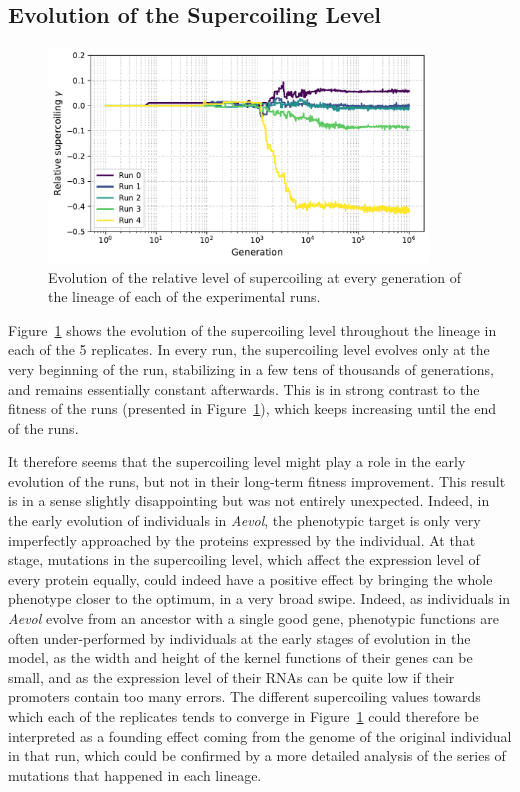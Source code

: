\subsection{Evolution of the Supercoiling Level}

\begin{figure}
\centering
\includegraphics[width=0.9\textwidth]{aevol/images/supercoiling_all.pdf}
\caption[Evolution of the supercoiling level of the experimental runs in \emph{Aevol}]{Evolution of the relative level of supercoiling at every generation of the lineage of each of the experimental runs.}
\label{fig:aevol:sc}
\end{figure}

Figure~\ref{fig:aevol:sc} shows the evolution of the supercoiling level throughout the lineage in each of the 5 replicates.
In every run, the supercoiling level evolves only at the very beginning of the run, stabilizing in a few tens of thousands of generations, and remains essentially constant afterwards.
This is in strong contrast to the fitness of the runs (presented in Figure~\ref{fig:aevol:sc}), which keeps increasing until the end of the runs.

It therefore seems that the supercoiling level might play a role in the early evolution of the runs, but not in their long-term fitness improvement.
This result is in a sense slightly disappointing but was not entirely unexpected.
Indeed, in the early evolution of individuals in \emph{Aevol}, the phenotypic target is only very imperfectly approached by the proteins expressed by the individual.
At that stage, mutations in the supercoiling level, which affect the expression level of every protein equally, could indeed have a positive effect by bringing the whole phenotype closer to the optimum, in a very broad swipe.
Indeed, as individuals in \emph{Aevol} evolve from an ancestor with a single good gene, phenotypic functions are often under-performed by individuals at the early stages of evolution in the model, as the width and height of the kernel functions of their genes can be small, and as the expression level of their RNAs can be quite low if their promoters contain too many errors.
The different supercoiling values towards which each of the replicates tends to converge in Figure~\ref{fig:aevol:sc} could therefore be interpreted as a founding effect coming from the genome of the original individual in that run, which could be confirmed by a more detailed analysis of the series of mutations that happened in each lineage.

